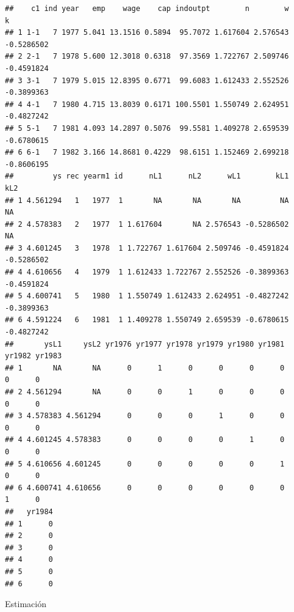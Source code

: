 \documentclass[
]{book}
\begin{document}
\begin{verbatim}
##    c1 ind year   emp    wage    cap indoutpt        n        w          k
## 1 1-1   7 1977 5.041 13.1516 0.5894  95.7072 1.617604 2.576543 -0.5286502
## 2 2-1   7 1978 5.600 12.3018 0.6318  97.3569 1.722767 2.509746 -0.4591824
## 3 3-1   7 1979 5.015 12.8395 0.6771  99.6083 1.612433 2.552526 -0.3899363
## 4 4-1   7 1980 4.715 13.8039 0.6171 100.5501 1.550749 2.624951 -0.4827242
## 5 5-1   7 1981 4.093 14.2897 0.5076  99.5581 1.409278 2.659539 -0.6780615
## 6 6-1   7 1982 3.166 14.8681 0.4229  98.6151 1.152469 2.699218 -0.8606195
##         ys rec yearm1 id      nL1      nL2      wL1        kL1        kL2
## 1 4.561294   1   1977  1       NA       NA       NA         NA         NA
## 2 4.578383   2   1977  1 1.617604       NA 2.576543 -0.5286502         NA
## 3 4.601245   3   1978  1 1.722767 1.617604 2.509746 -0.4591824 -0.5286502
## 4 4.610656   4   1979  1 1.612433 1.722767 2.552526 -0.3899363 -0.4591824
## 5 4.600741   5   1980  1 1.550749 1.612433 2.624951 -0.4827242 -0.3899363
## 6 4.591224   6   1981  1 1.409278 1.550749 2.659539 -0.6780615 -0.4827242
##       ysL1     ysL2 yr1976 yr1977 yr1978 yr1979 yr1980 yr1981 yr1982 yr1983
## 1       NA       NA      0      1      0      0      0      0      0      0
## 2 4.561294       NA      0      0      1      0      0      0      0      0
## 3 4.578383 4.561294      0      0      0      1      0      0      0      0
## 4 4.601245 4.578383      0      0      0      0      1      0      0      0
## 5 4.610656 4.601245      0      0      0      0      0      1      0      0
## 6 4.600741 4.610656      0      0      0      0      0      0      1      0
##   yr1984
## 1      0
## 2      0
## 3      0
## 4      0
## 5      0
## 6      0
\end{verbatim}

Estimación
\end{document}
